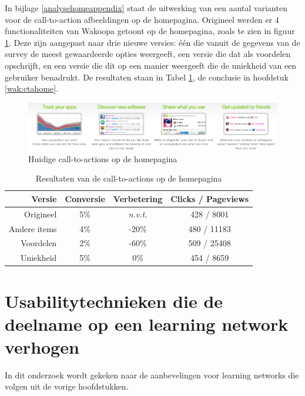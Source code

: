 \documentclass[a4paper, 10pt, pdftex]{report}
\begin{document}
      In bijlage \ref{analysehomeappendix} staat de uitwerking van een aantal varianten voor de call-to-action afbeeldingen op de homepagina. Origineel werden er 4 functionaliteiten van Wakoopa getoont op de homepagina, zoals te zien in figuur \ref{ctahomeimg}. Deze zijn aangepast naar drie nieuwe versies: \'e\'en die vanuit de gegevens van de survey de meest gewaardeerde opties weergeeft, een versie die dat als voordelen opschrijft, en een versie die dit op een manier weergeeft die de uniekheid van een gebruiker benadrukt. De resultaten staan in Tabel \ref{tab:ctahome}, de conclusie in hoofdstuk \ref{wak:ctahome}.
    \begin{figure}
      \begin{center}
        \includegraphics[width=\textwidth]{../images/newhomepage/original}
        \caption{Huidige call-to-actions op de homepagina}
        \label{ctahomeimg}
      \end{center}
    \end{figure}

        \begin{table}[ht]
        \centering
        \begin{tabular}{r|*{3}{c}}
          \textbf{Versie}                   & Conversie  & Verbetering    & Clicks / Pageviews \\ \hline
          Origineel                         & 5\%        & \emph{n.v.t.}  & 428 / 8001\\
          Andere items                      & 4\%        & -20\%          & 480 / 11183\\
          Voordelen                         & 2\%        & -60\%          & 509 / 25408\\
          Uniekheid                         & 5\%        & 0\%            & 454 / 8659\\
        \end{tabular}
        \caption{Resultaten van de call-to-actions op de homepagina}
        \label{tab:ctahome}
        \end{table}

  \newpage
  \chapter{Usabilitytechnieken die de deelname op een learning network verhogen}
    \label{globalchapter}
    In dit onderzoek wordt gekeken naar de aanbevelingen voor learning networks die volgen uit de vorige hoofdstukken.
\end{document}
